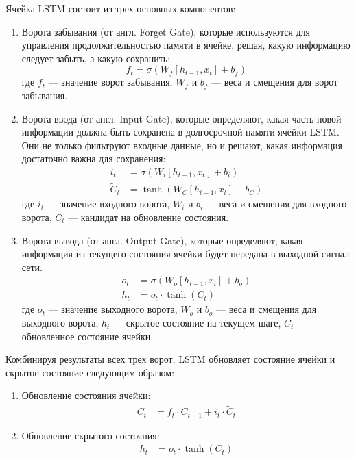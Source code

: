 \documentclass[a4paper,12pt]{extarticle}
\begin{document}
Ячейка LSTM состоит из трех основных компонентов:
\begin{enumerate}[label=\arabic*.]
	\item Ворота забывания (от англ. Forget Gate), которые используются для управления продолжительностью памяти в ячейке, решая, какую информацию следует забыть, а какую сохранить:
	\begin{equation}
		\label{rnn_hidden_layer}
		f_t = \sigma(W_f [h_{t-1}, x_t] + b_f)
	\end{equation}
	где \( f_t \) — значение ворот забывания, \( W_f \) и \( b_f \) — веса и смещения для ворот забывания.
	
	\item Ворота ввода (от англ. Input Gate), которые определяют, какая часть новой информации должна быть сохранена в долгосрочной памяти ячейки LSTM. Они не только фильтруют входные данные, но и решают, какая информация достаточно важна для сохранения:
	\begin{align}
		i_t &= \sigma(W_i [h_{t-1}, x_t] + b_i) \\
		\tilde{C}_t &= \tanh(W_C [h_{t-1}, x_t] + b_C)
	\end{align}
	где \( i_t \) — значение входного ворота, \( W_i \) и \( b_i \) — веса и смещения для входного ворота, \( \tilde{C}_t \) — кандидат на обновление состояния.
	
	\item Ворота вывода (от англ. Output Gate), которые определяют, какая информация из текущего состояния ячейки будет передана в выходной сигнал сети.
	\begin{align}
		o_t &= \sigma(W_o [h_{t-1}, x_t] + b_o) \\
		h_t &= o_t \cdot \tanh(C_t)
	\end{align}
	где \( o_t \) — значение выходного ворота, \( W_o \) и \( b_o \) — веса и смещения для выходного ворота, \( h_t \) — скрытое состояние на текущем шаге, \( C_t \) — обновленное состояние ячейки.
\end{enumerate}

Комбинируя результаты всех трех ворот, LSTM обновляет состояние ячейки и скрытое состояние следующим образом:
\begin{enumerate}[label=\arabic*.]
	\item Обновление состояния ячейки:
	\begin{align}
	 	C_t &= f_t \cdot C_{t-1} + i_t \cdot \tilde{C}_t
	\end{align}
	\item Обновление скрытого состояния:
	\begin{align}
		h_t &= o_t \cdot \tanh(C_t)
	\end{align}
\end{enumerate}
\end{document}
